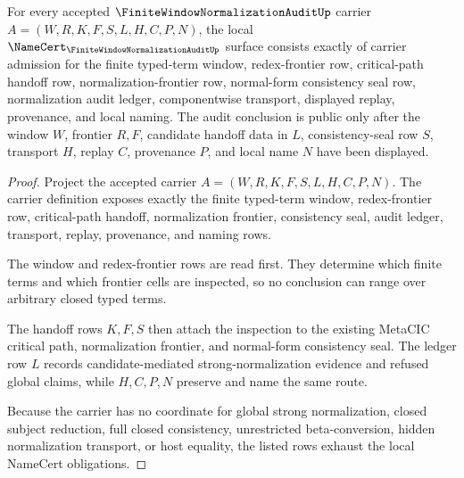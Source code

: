 \begin{theorem}
\label{thm:finite-window-normalization-audit-namecert-obligations}
For every accepted $\FiniteWindowNormalizationAuditUp$ carrier $A=(W,R,K,F,S,L,H,C,P,N)$, the local $\NameCert_{\FiniteWindowNormalizationAuditUp}$ surface consists exactly of carrier admission for the finite typed-term window, redex-frontier row, critical-path handoff row, normalization-frontier row, normal-form consistency seal row, normalization audit ledger, componentwise transport, displayed replay, provenance, and local naming. The audit conclusion is public only after the window $W$, frontier $R,F$, candidate handoff data in $L$, consistency-seal row $S$, transport $H$, replay $C$, provenance $P$, and local name $N$ have been displayed.
\end{theorem}
\begin{proof}
Project the accepted carrier $A=(W,R,K,F,S,L,H,C,P,N)$. The carrier definition exposes exactly the finite typed-term window, redex-frontier row, critical-path handoff, normalization frontier, consistency seal, audit ledger, transport, replay, provenance, and naming rows.

The window and redex-frontier rows are read first. They determine which finite terms and which frontier cells are inspected, so no conclusion can range over arbitrary closed typed terms.

The handoff rows $K,F,S$ then attach the inspection to the existing MetaCIC critical path, normalization frontier, and normal-form consistency seal. The ledger row $L$ records candidate-mediated strong-normalization evidence and refused global claims, while $H,C,P,N$ preserve and name the same route.

Because the carrier has no coordinate for global strong normalization, closed subject reduction, full closed consistency, unrestricted beta-conversion, hidden normalization transport, or host equality, the listed rows exhaust the local NameCert obligations.
\end{proof}

